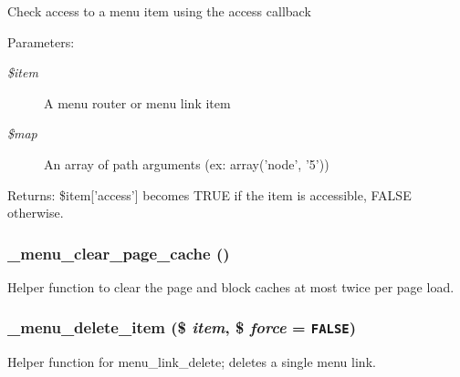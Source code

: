 Check access to a menu item using the access callback

\begin{Desc}
\item[Parameters:]
\begin{description}
\item[{\em \$item}]A menu router or menu link item \item[{\em \$map}]An array of path arguments (ex: array('node', '5')) \end{description}
\end{Desc}
\begin{Desc}
\item[Returns:]\$item\mbox{[}'access'\mbox{]} becomes TRUE if the item is accessible, FALSE otherwise. \end{Desc}
\hypertarget{group__menu_g6b3bf9ba8f43f983382911beb62ffba0}{
\subsubsection[{\_\-menu\_\-clear\_\-page\_\-cache}]{\setlength{\rightskip}{0pt plus 5cm}\_\-menu\_\-clear\_\-page\_\-cache ()}}
\label{group__menu_g6b3bf9ba8f43f983382911beb62ffba0}


Helper function to clear the page and block caches at most twice per page load. \hypertarget{group__menu_gf60be5755b46e635c04963e61cdc809a}{
\subsubsection[{\_\-menu\_\-delete\_\-item}]{\setlength{\rightskip}{0pt plus 5cm}\_\-menu\_\-delete\_\-item (\$ {\em item}, \/  \$ {\em force} = {\tt FALSE})}}
\label{group__menu_gf60be5755b46e635c04963e61cdc809a}


Helper function for menu\_\-link\_\-delete; deletes a single menu link.


